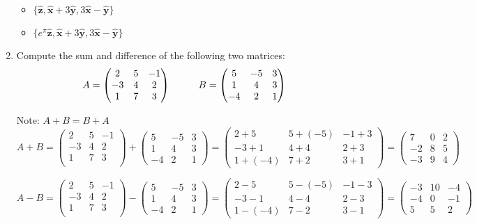 \documentclass[fleqn]{article}
\begin{document}
\begin{enumerate}
\begin{itemize}
\item $\{ \mathbf{\hat{z}}, \mathbf{\hat{x}}+3\mathbf{\hat{y}}, 3\mathbf{\hat{x}}-\mathbf{\hat{y}}\}$

\item $\{ e^\pi \mathbf{\hat{z}}, \mathbf{\hat{x}}+3\mathbf{\hat{y}}, 3\mathbf{\hat{x}}-\mathbf{\hat{y}}\}$
\end{itemize}


\item  Compute the sum and difference of the following two matrices:
$$A=\begin{pmatrix}
2 & 5 & -1 \\
-3 & 4 & 2 \\
1 & 7 & 3
\end{pmatrix} \hskip 1truecm B=\begin{pmatrix}
5 & -5 & 3 \\
1 & 4 & 3 \\
-4 & 2 & 1
\end{pmatrix}$$ 

Note: $A+B=B+A$
\\
\noindent
$A+B=
\begin{pmatrix}
    2 & 5 & -1 \\
    -3 & 4 & 2 \\ 
    1 & 7 & 3 \\ 
\end{pmatrix}
+
\begin{pmatrix}
  5 & -5 & 3 \\
  1 & 4 & 3 \\
  -4 & 2 & 1
\end{pmatrix}
=
\begin{pmatrix}
  2+5 & 5+(-5) & -1+3 \\
  -3+1 & 4+4 & 2+3 \\
  1+(-4) & 7+2 & 3+1
\end{pmatrix}
=
\begin{pmatrix}
  7 & 0 & 2 \\
  -2 & 8 & 5 \\
  -3 & 9 & 4
\end{pmatrix}
$

\noindent
$A-B=
\begin{pmatrix}
    2 & 5 & -1 \\
    -3 & 4 & 2 \\ 
    1 & 7 & 3 \\ 
\end{pmatrix}
-
\begin{pmatrix}
  5 & -5 & 3 \\
  1 & 4 & 3 \\
  -4 & 2 & 1
\end{pmatrix}
=
\begin{pmatrix}
  2-5 & 5-(-5) & -1-3 \\
  -3-1 & 4-4 & 2-3 \\
  1-(-4) & 7-2 & 3-1
\end{pmatrix}
=
\begin{pmatrix}
  -3 & 10 & -4 \\
  -4 & 0 & -1 \\
  5 & 5 & 2
\end{pmatrix}
$


\end{enumerate}
\end{document}
